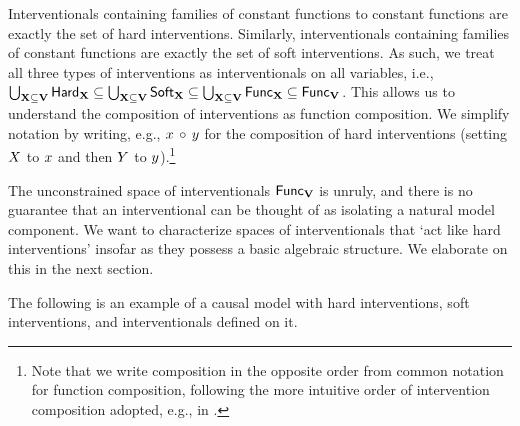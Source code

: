 \documentclass[twoside,11pt]{article}
\begin{document}
\begin{remark}  Interventionals containing families of constant functions to constant functions are exactly the set of hard interventions. Similarly, interventionals containing families of constant functions are exactly the set of soft interventions. As such, we treat all three types of interventions as interventionals on all variables, i.e., $\bigcup_{\mathbf{X} \subseteq \mathbf{V}} \mathsf{Hard}_{\mathbf{X}} \subseteq \bigcup_{\mathbf{X} \subseteq \mathbf{V}} \mathsf{Soft}_{\mathbf{X}}  \subseteq \bigcup_{\mathbf{X} \subseteq \mathbf{V}} \mathsf{Func}_{\mathbf{X}} \subseteq \mathsf{Func}_{\mathbf{V}}$. This allows us to understand the composition of interventions as function composition. We simplify notation by writing, e.g., $x \,\circ\, y$ for the composition of hard interventions (setting $X$ to $x$ and then $Y$ to $y$).\footnote{Note that we write composition in the opposite order from common notation for function composition, following the more intuitive order of intervention composition adopted, e.g., in \cite{Rubinstein2017}.}
\end{remark}
The unconstrained space of interventionals $\mathsf{Func}_{\mathbf{V}}$ is unruly, and there is no guarantee that an interventional can be thought of as isolating a natural model component. We want to characterize spaces of interventionals that `act like hard interventions' insofar as they possess a basic algebraic structure. We elaborate on this in the next section. 

The following is an example of a causal model with hard interventions, soft interventions, and interventionals defined on it.
\end{document}
